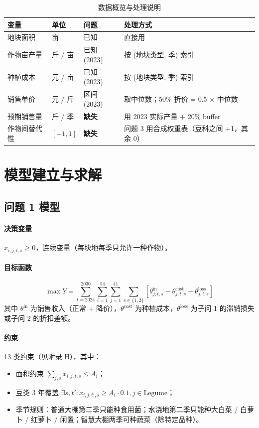 \documentclass[UTF8,a4paper,12pt]{ctexart}
\begin{document}
\begin{table}[H]
  \centering
  \caption{数据概览与处理说明}
  \label{tab:data-overview}
  \begin{tabular}{llll}
    \toprule
    变量 & 单位 & 问题 & 处理方式 \\
    \midrule
    地块面积 & 亩 & 已知 & 直接用 \\
    作物亩产量 & 斤 / 亩 & 已知 (2023) & 按 (地块类型, 季) 索引 \\
    种植成本 & 元 / 亩 & 已知 (2023) & 按 (地块类型, 季) 索引 \\
    销售单价 & 元 / 斤 & 区间 (2023) & 取中位数；50\% 折价 = 0.5 $\times$ 中位数 \\
    预期销售量 & 斤 / 季 & \textbf{缺失} & 用 2023 实际产量 + 20\% buffer \\
    作物间替代性 & $[-1,1]$ & \textbf{缺失} & 问题 3 用合成权重表（豆科之间 +1，其余 0） \\
    \bottomrule
  \end{tabular}
\end{table}

\section{模型建立与求解}

\subsection{问题 1 模型}
\paragraph{决策变量} $x_{i,j,t,s} \ge 0$，连续变量（每块地每季只允许一种作物）。
\paragraph{目标函数}
\begin{equation}
\max Y = \sum_{t=2024}^{2030}\sum_{i=1}^{54}\sum_{j=1}^{41}\sum_{s\in\{1,2\}}\left[ \theta_{j,t,s}^{\text{in}} - \theta_{j,t,s}^{\text{cost}} - \theta_{j,t,s}^{\text{loss}} \right]
\end{equation}
其中 $\theta^{\text{in}}$ 为销售收入（正常 + 降价），$\theta^{\text{cost}}$ 为种植成本，$\theta^{\text{loss}}$ 为子问 1 的滞销损失或子问 2 的折扣差额。
\paragraph{约束} 13 类约束（见附录 H），其中：
\begin{itemize}
  \item 面积约束 $\sum_{j,s} x_{i,j,t,s} \le A_i$；
  \item 豆类 3 年覆盖 $\exists s,t': x_{i,j,t',s} \ge A_i \cdot 0.1, j \in \text{Legume}$；
  \item 季节规则：普通大棚第二季只能种食用菌；水浇地第二季只能种大白菜 / 白萝卜 / 红萝卜 / 闲置；智慧大棚两季可种蔬菜（除特定品种）。
\end{itemize}
\end{document}
